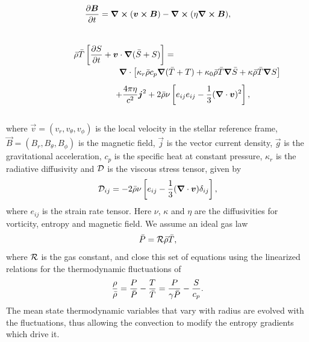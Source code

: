 %
\begin{equation}
  \label{eq:induction}
  \frac{\partial\boldsymbol{B}}{\partial t} = 
       \boldsymbol{\nabla} \boldsymbol{\times} (\boldsymbol{v} \boldsymbol{\times} \boldsymbol{B}) - \boldsymbol{\nabla} \boldsymbol{\times} (\eta \boldsymbol{\nabla} \boldsymbol{\times} \boldsymbol{B}), 
\end{equation}\\[-5mm]
%
\begin{equation}
  \label{eq:entropy}
  \begin{array}{c}
  \displaystyle 
  \bar{\rho}\bar{T}
  \left[\frac{\partial S}{\partial t} + \boldsymbol{v} \cdot \boldsymbol{\nabla}(\bar{S}+S)\right]  = \qquad\qquad\qquad\qquad \\[3mm]
  \displaystyle 
  \qquad\qquad\qquad\qquad\qquad \boldsymbol{\nabla} \cdot \left[ \kappa_r \bar{\rho} c_p \boldsymbol{\nabla}(\bar{T}+T) 
                    +\kappa_0 \bar{\rho} \bar{T} \boldsymbol{\nabla} \bar{S}
		    +\kappa \bar{\rho} \bar{T} \boldsymbol{\nabla} S \right] \\[3mm]
  \displaystyle 
  \qquad\qquad\qquad + \frac{4 \pi \eta}{c^2} \boldsymbol{j}^2 
  + 2 \bar{\rho}\nu \left[e_{ij}e_{ij} - \frac{1}{3}(\boldsymbol{\nabla} \cdot \boldsymbol{v})^2\right],
  \end{array}
\end{equation}\\[-5mm]
where $\vec{v} = (v_r, v_\theta, v_\phi)$ is the local velocity
in the stellar reference frame,
$\vec{B}=(B_r, B_\theta, B_\phi)$ is the magnetic field, $\vec{j}$ is
the vector current density, 
$\vec{g}$ is the gravitational acceleration, 
$c_p$ is the specific heat at constant pressure, 
$\kappa_r$ is the radiative diffusivity and $\mathcal{D}$ is the viscous
stress tensor, given by
\begin{equation}
  \mathcal{D}_{ij} = -2 \bar{\rho} \nu \left[e_{ij} 
    - \frac{1}{3}(\boldsymbol{\nabla} \cdot \boldsymbol{v})\delta_{ij} \right],
\end{equation}
where $e_{ij}$ is the strain rate tensor.  Here $\nu$,
$\kappa$ and $\eta$ are the diffusivities for vorticity,
entropy and magnetic field.  We assume an ideal gas law
\begin{equation}
  \bar{P} = \mathcal{R} \bar{\rho} \bar{T},
\end{equation}
where $\mathcal{R}$ is the gas constant, and close this
set of equations using the linearized relations for the thermodynamic
fluctuations of
\begin{equation}
  \frac{\rho}{\bar{\rho}} = \frac{P}{\bar{P}} - \frac{T}{\bar{T}}
    =  \frac{P}{\gamma \bar{P}} - \frac{S}{c_p}.
\end{equation}
The mean state thermodynamic variables that vary with radius are
evolved with the fluctuations, thus allowing the convection to modify
the entropy gradients which drive it. 

